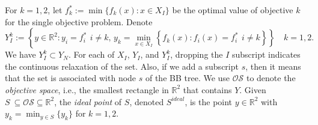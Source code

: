 \documentclass[11.5pt]{article}
\newcommand{\R}{\mathbb{R}}
\newcommand{\Z}{\mathbb{Z}}
\renewcommand{\S}{\mathcal{S}}
\newcommand{\OS}{\mathcal{OS}}
\newcommand{\comment}[1]{{\color{red} #1}}
\begin{document}
For $k=1,2$, let $f^{\ast}_{k} := \min\{f_{k}(x)\colon x\in X_{I}\}$ be the optimal value of objective $k$ for the single objective problem. Denote
\begin{equation}
Y^{k}_I := \left\{y\in \R^{2} \colon y_{i} = f^{\ast}_{i} \ \, i\neq k,\, y_k = \min_{x\in X_I} \left\{ f_k(x) \colon f_i(x) = f^{\ast}_{i} \ \,  i\neq k\right\} \right\} \quad k=1,2.
\end{equation}
We have $Y^{k}_{I}\subset Y_{N}$. For each of $X_I$, $Y_I$, and $Y^k_I$, dropping the $I$ subscript indicates the continuous relaxation of the set. Also, if we add a subscript $s$, then it means that the set is associated with node $s$ of the BB tree. We use $\OS$ to denote the \emph{objective space}, i.e., the smallest rectangle in $\R^2$ that contains $Y$. Given $S\ \subseteq \OS \subseteq \R^2$, the \emph{ideal point} of $S$, denoted $S^{ideal}$, is the point $y \in \R^2$ with $y_k = \min_{y \in S}\{y_k\}$ for $k =1,2$. %
%
\end{document}
